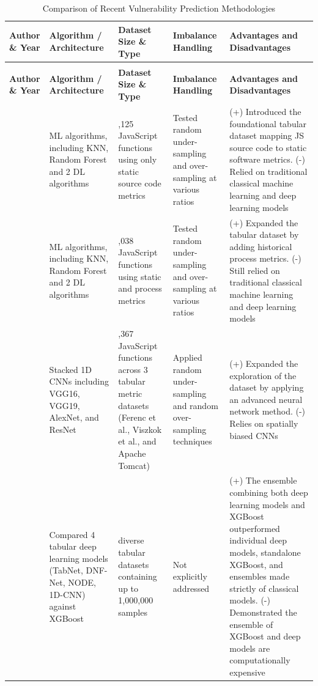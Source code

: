{\footnotesize
\setlength{\tabcolsep}{3pt}
\renewcommand{\arraystretch}{1.15}
\begin{longtable}{|>{\raggedright\arraybackslash}p{2.2cm}|>{\raggedright\arraybackslash}p{2.6cm}|>{\raggedright\arraybackslash}p{2.7cm}|>{\raggedright\arraybackslash}p{2.3cm}|>{\raggedright\arraybackslash}p{3.2cm}|}
\caption{Comparison of Recent Vulnerability Prediction Methodologies}
\label{tab:vuln-methods}\\
\hline
\textbf{Author \& Year} & \textbf{Algorithm / Architecture} & \textbf{Dataset Size \& Type} & \textbf{Imbalance Handling} & \textbf{Advantages and Disadvantages} \\
\hline
\endfirsthead
\multicolumn{5}{c}{\tablename\ \thetable\ (continued)}\\
\hline
\textbf{Author \& Year} & \textbf{Algorithm / Architecture} & \textbf{Dataset Size \& Type} & \textbf{Imbalance Handling} & \textbf{Advantages and Disadvantages} \\
\hline
\endhead
\hline
\endfoot
\citet{ferenc_challenging_2019} & 8 ML algorithms, including KNN, Random Forest and 2 DL algorithms & 12,125 JavaScript functions using only static source code metrics & Tested random under-sampling and over-sampling at various ratios & (+) Introduced the foundational tabular dataset mapping JS source code to static software metrics. (-) Relied on traditional classical machine learning and deep learning models \\
\hline
\citet{viszkok_improving_2021} & 8 ML algorithms, including KNN, Random Forest and 2 DL algorithms & 8,038 JavaScript functions using static and process metrics & Tested random under-sampling and over-sampling at various ratios & (+) Expanded the tabular dataset by adding historical process metrics. (-) Still relied on traditional classical machine learning and deep learning models \\
\hline
\citet{sheneamer_vulnerable_2024} & Stacked 1D CNNs including VGG16, VGG19, AlexNet, and ResNet & 30,367 JavaScript functions across 3 tabular metric datasets (Ferenc et al., Viszkok et al., and Apache Tomcat) & Applied random under-sampling and random over-sampling techniques & (+) Expanded the exploration of the dataset by applying an advanced neural network method. (-) Relies on spatially biased CNNs \\
\hline
\citet{shwartz-ziv_tabular_2022} & Compared 4 tabular deep learning models (TabNet, DNF-Net, NODE, 1D-CNN) against XGBoost & 11 diverse tabular datasets containing up to 1,000,000 samples & Not explicitly addressed & (+) The ensemble combining both deep learning models and XGBoost outperformed individual deep models, standalone XGBoost, and ensembles made strictly of classical models. (-) Demonstrated the ensemble of XGBoost and deep models are computationally expensive \\

\end{longtable}}
